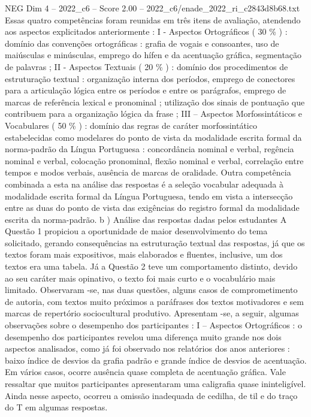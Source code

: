 \begin{textsample}{NEG Dim 4 – 2022\_c6 – Score 2.00 – 2022\_c6/enade\_2022\_ri\_c2843d8b68.txt}
Essas quatro competências foram reunidas em três itens de avaliação, atendendo aos aspectos explicitados anteriormente : I - Aspectos Ortográficos ( 30 \% ) : domínio das convenções ortográficas : grafia de vogais e consoantes, uso de maiúsculas e minúsculas, emprego do hífen e da acentuação gráfica, segmentação de palavras ; II - Aspectos Textuais ( 20 \% ) : domínio dos procedimentos de estruturação textual : organização interna dos períodos, emprego de conectores para a articulação lógica entre os períodos e entre os parágrafos, emprego de marcas de referência lexical e pronominal ; utilização dos sinais de pontuação que contribuem para a organização lógica da frase ; III – Aspectos Morfossintáticos e Vocabulares ( 50 \% ) : domínio das regras de caráter morfossintático estabelecidas como modelares do ponto de vista da modalidade escrita formal da norma-padrão da Língua Portuguesa : concordância nominal e verbal, regência nominal e verbal, colocação pronominal, flexão nominal e verbal, correlação entre tempos e modos verbais, ausência de marcas de oralidade.
Outra competência combinada a esta na análise das respostas é a seleção vocabular adequada à modalidade escrita formal da Língua Portuguesa, tendo em vista a intersecção entre as duas do ponto de vista das exigências do registro formal da modalidade escrita da norma-padrão. b ) Análise das respostas dadas pelos estudantes A Questão 1 propiciou a oportunidade de maior desenvolvimento do tema solicitado, gerando consequências na estruturação textual das respostas, já que os textos foram mais expositivos, mais elaborados e fluentes, inclusive, um dos textos era uma tabela.
Já a Questão 2 teve um comportamento distinto, devido ao seu caráter mais opinativo, o texto foi mais curto e o vocabulário mais limitado.
Observaram -se, nas duas questões, alguns casos de comprometimento de autoria, com textos muito próximos a paráfrases dos textos motivadores e sem marcas de repertório sociocultural produtivo.
Apresentam -se, a seguir, algumas observações sobre o desempenho dos participantes : I – Aspectos Ortográficos : o desempenho dos participantes revelou uma diferença muito grande nos dois aspectos analisados, como já foi observado nos relatórios dos anos anteriores : baixo índice de desvios da grafia padrão e grande índice de desvios de acentuação.
Em vários casos, ocorre ausência quase completa de acentuação gráfica.
Vale ressaltar que muitos participantes apresentaram uma caligrafia quase ininteligível.
Ainda nesse aspecto, ocorreu a omissão inadequada de cedilha, de til e do traço do T em algumas respostas.

\end{textsample}
